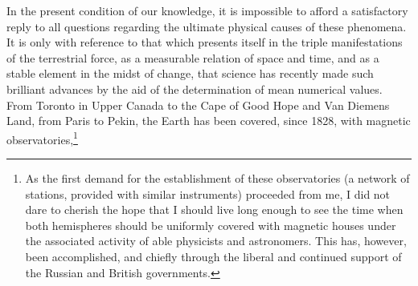 In the present condition of our knowledge, it is impossible to afford a satisfactory reply to all questions regarding the ultimate physical causes of these phenomena. It is only with reference to that which presents itself in the triple manifestations of the terrestrial force, as a measurable relation of space and time, and as a stable element in the midst of change, that science has recently made such brilliant advances by the aid of the determination of mean numerical values. From Toronto in Upper Canada to the Cape of Good Hope and Van Diemens Land, from Paris to Pekin, the Earth has been covered, since 1828, with magnetic observatories,\footnote{As the first demand for the establishment of these observatories (a network of stations, provided with similar instruments) proceeded from me, I did not dare to cherish the hope that I should live long enough to see the time when both hemispheres should be uniformly covered with magnetic houses under the associated activity of able physicists and astronomers. This has, however, been accomplished, and chiefly through the liberal and continued support of the Russian and British governments.
 
}
